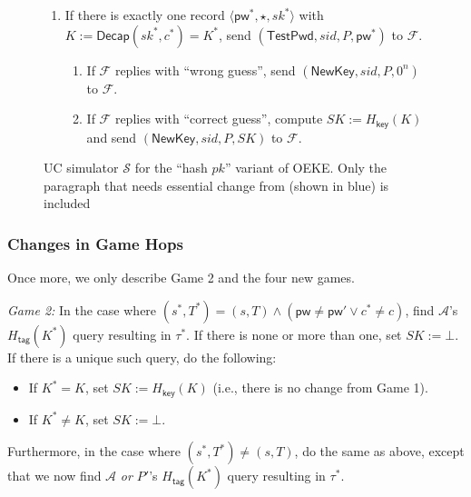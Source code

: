 \documentclass{article}
\theoremstyle{plain}
\theoremstyle{definition}
\theoremstyle{remark}
\newcommand{\adv}{\mathcal{A}}
\renewcommand{\sim}{\mathcal{S}}
\newcommand{\func}{\mathcal{F}}
\newcommand{\Decap}{\mathsf{Decap}}
\newcommand{\Hkey}{H_\mathsf{key}}
\newcommand{\Htag}{H_\mathsf{tag}}
\newcommand{\pw}{\mathsf{pw}}
\newcommand{\TestPwd}{\mathsf{TestPwd}}
\newcommand{\NewKey}{\mathsf{NewKey}}
\begin{document}
\begin{figure}[H]
\begin{framed}
\begin{small}
\begin{enumerate}
\begin{enumerate}
        \item If there is exactly one record $\langle\pw^*,\star,sk^*\rangle$ with $K := \Decap(sk^*,c^*) = K^*$, send $(\TestPwd, sid, P, \pw^*)$ to $\func$.
            \begin{enumerate}
              \item If $\func$ replies with ``wrong guess'', send $(\NewKey, sid, P, 0^n)$ to $\func$.
              \item If $\func$ replies with ``correct guess'', compute $SK := \Hkey(K)$ and send $(\NewKey, sid, P, SK)$ to $\func$.
            \end{enumerate}
      \end{enumerate}
\end{enumerate}
\end{small}
\end{framed}
\caption{UC simulator $\sim$ for the ``hash $pk$'' variant of OEKE. Only the paragraph that needs essential change from  (shown in {\color{blue}blue}) is included}
\label{fig:oeke-sim-hash-nothing}
\end{figure}

\subsubsection{Changes in Game Hops}
\label{app:game-hops-hash-nothing}
Once more, we only describe Game 2 and the four new games.

\medskip\noindent\emph{Game 2:} In the case where $(s^*,T^*) = (s,T) \land (\pw \neq \pw' \lor c^* \neq c)$, find $\adv$'s $\Htag(K^*)$ query resulting in $\tau^*$. If there is none or more than one, set $SK := \bot$. If there is a unique such query, do the following:
\begin{itemize}
  \item If $K^* = K$, set $SK := \Hkey(K)$ (i.e., there is no change from Game 1).
  \item If $K^* \neq K$, set $SK := \bot$.
\end{itemize}

Furthermore, in the case where $(s^*,T^*) \neq (s,T)$, do the same as above, except that we now find $\adv$ \emph{or $P'$}'s $\Htag(K^*)$ query resulting in $\tau^*$.
\end{document}
